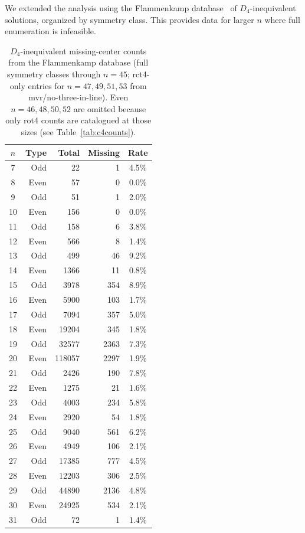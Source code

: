 \documentclass[11pt,a4paper]{article}
\theoremstyle{plain}
\theoremstyle{definition}
\begin{document}
We extended the analysis using the Flammenkamp database~\cite{flammenkamp} of $D_4$-inequivalent solutions, organized by symmetry class. This provides data for larger $n$ where full enumeration is infeasible.

\begin{table}[H]
\centering
\caption{$D_4$-inequivalent missing-center counts from the Flammenkamp database (full symmetry classes through $n=45$; rct4-only entries for $n=47,49,51,53$ from mvr/no-three-in-line). Even $n=46,48,50,52$ are omitted because only rot4 counts are catalogued at those sizes (see Table~\ref{tab:c4counts}).}
\label{tab:d4}
\footnotesize
\begin{tabular}{crrrc}
\toprule
$n$ & Type & Total & Missing & Rate \\
\midrule
7 & Odd & 22 & 1 & 4.5\%\\
8 & Even & 57 & 0 & 0.0\%\\
9 & Odd & 51 & 1 & 2.0\%\\
10 & Even & 156 & 0 & 0.0\%\\
11 & Odd & 158 & 6 & 3.8\%\\
12 & Even & 566 & 8 & 1.4\%\\
13 & Odd & 499 & 46 & 9.2\%\\
14 & Even & 1366 & 11 & 0.8\%\\
15 & Odd & 3978 & 354 & 8.9\%\\
16 & Even & 5900 & 103 & 1.7\%\\
17 & Odd & 7094 & 357 & 5.0\%\\
18 & Even & 19204 & 345 & 1.8\%\\
19 & Odd & 32577 & 2363 & 7.3\%\\
20 & Even & 118057 & 2297 & 1.9\%\\
21 & Odd & 2426 & 190 & 7.8\%\\
22 & Even & 1275 & 21 & 1.6\%\\
23 & Odd & 4003 & 234 & 5.8\%\\
24 & Even & 2920 & 54 & 1.8\%\\
25 & Odd & 9040 & 561 & 6.2\%\\
26 & Even & 4949 & 106 & 2.1\%\\
27 & Odd & 17385 & 777 & 4.5\%\\
28 & Even & 12203 & 306 & 2.5\%\\
29 & Odd & 44890 & 2136 & 4.8\%\\
30 & Even & 24925 & 534 & 2.1\%\\
31 & Odd & 72 & 1 & 1.4\%\\

\end{tabular}
\end{table}
\end{document}
